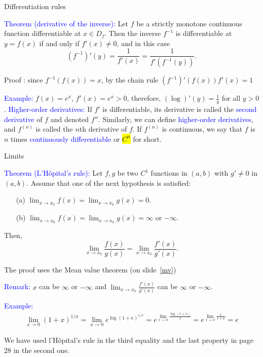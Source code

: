 \documentclass[11pt,aspectratio=169]{beamer}
\begin{document}
\begin{frame}{Differentiation rules}

\textcolor{blue}{Theorem (derivative of the inverse):} Let $f$ be a strictly monotone continuous function  differentiable at $x \in D_f$. Then the inverse $f^{-1}$ is differentiable at $y=f(x)$ if and only if $f'(x) \neq 0$, and in this case
$$
(f^{-1})'(y)=\frac{1}{f'(x)}=\frac{1}{f'(f^{-1}(y))}.
$$
\begin{tiny} Proof : since $f^{-1}(f(x))=x$, by the chain rule $(f^{-1})'(f(x))f'(x)=1$ \end{tiny}
\vskip 11pt
\textcolor{blue}{Example:}  $f(x)=e^x$, $f'(x)=e^x > 0$, therefore, $(\log)'(y)=\frac{1}{y}$ for all $y>0$.
\vskip 11pt
\textcolor{blue}{Higher-order derivatives:} If $f'$ is differentiable,  its derivative is called the \textcolor{blue}{second derivative} of $f$ and  denoted $f''$. Similarly, we can define \textcolor{blue}{higher-order derivatives}, and $f^{(n)}$ is called the $n$th derivative of $f$. If $f^{(n)}$ is continuous, we say that $f$ is $n$ times \textcolor{blue}{continuously differentiable} or \hl{$C^{n}$} for short.
\end{frame}

\begin{frame}{Limits}

 \textcolor{blue}{Theorem (L'H\^opital's rule):} Let $f,g$ be  two $C^1$ functions in $(a,b)$ with $g' \neq 0$
in $(a,b)$. Assume that one of the next hypothesis is satisfied:
\begin{itemize}
\item[(a)] $\lim_{x \rightarrow x_0} f(x)=\lim_{x \rightarrow x_0} g(x)=0$.
\item[(b)] $\lim_{x \rightarrow x_0} f(x)=\lim_{x \rightarrow x_0} g(x)=\infty$ or $-\infty$.
\end{itemize}
Then,
$$
\lim_{x \rightarrow x_0} \frac{f(x)}{g(x)}=\lim_{x \rightarrow x_0} \frac{f'(x)}{g'(x)}.
$$
\begin{tiny} The proof uses the Mean value theorem (on slide~\ref{mv}) \end{tiny}

\begin{tiny}\textcolor{blue}{Remark:} $x$ can be $\infty$ or $-\infty$ and $\lim_{x \rightarrow x_0} \frac{f'(x)}{g'(x)}$
can be $\infty$ or $-\infty$.\end{tiny}
\vskip 12pt
\textcolor{blue}{Example:} 
\begin{equation*}
\begin{split}
\lim_{x \rightarrow 0} (1+x)^{1/x}=\lim_{x \rightarrow 0} e^{\log (1+x)^{1/x}}=
e^{\lim_{x \rightarrow 0} \frac{\log (1+x)}{x}}=e^{\lim_{x \rightarrow 0} \frac{1}{1+x}}=e
\end{split}
\end{equation*}
\begin{tiny}We have used l'H\^opital's rule in the third equality and the last property in page 28 in the second one.\end{tiny}
\end{frame}
\end{document}
